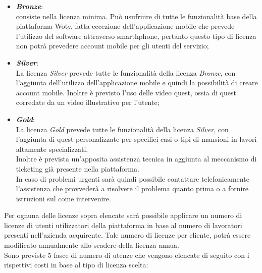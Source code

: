 \begin{itemize}
\item \textbf{\textit{Bronze}}:\\
consiste nella licenza minima.
Può usufruire di tutte le funzionalità base della piattaforma Woty, fatta eccezione dell'applicazione mobile che prevede l'utilizzo del software attraverso smarthphone, pertanto questo tipo di licenza non potrà prevedere account mobile per gli utenti del servizio;


\item \textbf{\textit{Silver}}:\\
La licenza \textit{Silver} prevede tutte le funzionalità della licenza \textit{Bronze}, con l'aggiunta dell'utilizzo dell'applicazione mobile e quindi la possibilità di creare account mobile.
Inoltre è previsto l'uso delle video quest, ossia di quest corredate da un video illustrativo per l'utente;


\item \textbf{\textit{Gold}}:\\
La licenza \textit{Gold} prevede tutte le funzionalità della licenza \textit{Silver}, con l'aggiunta di quest personalizzate per specifici casi o tipi di mansioni in lavori altamente specializzati.\\
Inoltre è prevista un'apposita assistenza tecnica in aggiunta al meccanismo di ticketing già presente nella piattaforma.\\
In caso di problemi urgenti sarà quindi possibile contattare telefonicamente l'assistenza che provvederà a risolvere il problema quanto prima o a fornire istruzioni sul come intervenire.\\

\end{itemize}

Per ognuna delle licenze sopra elencate sarà possibile applicare un numero di licenze di utenti utilizzatori della piattaforma in base al numero di lavoratori presenti nell'azienda acquirente. Tale numero di licenze per cliente, potrà essere modificato annualmente allo scadere della licenza annua.\\
Sono previste 5 fasce di numero di utenze che vengono elencate di seguito con i rispettivi costi in base al tipo di licenza scelta:

